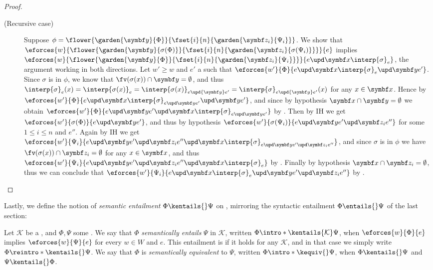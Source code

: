 \begin{scope}
\begin{proof}
\begin{description}
    \item[(Recursive case)]
    Suppose $\phi =
    \flower{\garden{\by}{\Phi}}{\fset{i}{n}{\garden{\bz_i}{\Psi_i}}}$. We show
    that
    $\eforces{w}{\flower{\garden{\by}{\sigma(\Phi)}}{\fset{i}{n}{\garden{\bz_i}{\sigma(\Psi_i)}}}}{e}$
    implies
    $\eforces{w}{\flower{\garden{\by}{\Phi}}{\fset{i}{n}{\garden{\bz_i}{\Psi_i}}}}{\update{e}{\bx}{\interp{\sigma}}_e}$,
    the argument working in both directions. Let $w' \geq w$ and $e'$ a
     such that
    $\eforces{w'}{\Phi}{\update{e}{\bx}{\update{\interp{\sigma}_e}{\by}{e'}}}$.
    Since $\sigma$ is  in $\phi$, we know that $\fv(\sigma(x))
    \cap \by = \emptyset$, and thus $\interp{\sigma}_e(x) =
    \interp{\sigma(x)}_{e} = \interp{\sigma(x)}_{e \upd{\by} e'} =
    \interp{\sigma}_{e \upd{\by} e'}(x)$ for any $x \in \bx$. Hence by
    $\eforces{w'}{\Phi}{\update{e}{\bx}{\update{\interp{\sigma}_{\update{e}{\by}{e'}}}{\by}{e'}}}$,
    and since by hypothesis $\bx \cap \by = \emptyset$ we obtain
    $\eforces{w'}{\Phi}{\update{e}{\by}{\update{e'}{\bx}{\interp{\sigma}_{\update{e}{\by}{e'}}}}}$
    by . Then by IH we get
    $\eforces{w'}{\sigma(\Phi)}{\update{e}{\by}{e'}}$, and thus by hypothesis
    $\eforces{w'}{\sigma(\Psi_i)}{\update{e}{\by}{\update{e'}{\bz_i}{e''}}}$ for
    some $1 \leq i \leq n$ and  $e''$. Again by IH we get
    $\eforces{w'}{\Psi_i}{\update{e}{\by}{\update{e'}{\bz_i}{\update{e''}{\bx}{\interp{\sigma}_{\update{e}{\by}{\update{e'}{\bz_i}{e''}}}}}}}$,
    and since $\sigma$ is  in $\phi$ we have $\fv(\sigma(x))
    \cap \bz_i = \emptyset$ for any $x \in \bx$, and thus
    $\eforces{w'}{\Psi_i}{\update{e}{\by}{\update{e'}{\bz_i}{\update{e''}{\bx}{\interp{\sigma}_{e}}}}}$
    by . Finally by hypothesis $\bx \cap \bz_i =
    \emptyset$, thus we can conclude that
    $\eforces{w'}{\Psi_i}{\update{e}{\bx}{\update{\interp{\sigma}_{e}}{\by}{\update{e'}{\bz_i}{e''}}}}$
    by .
  \end{description}
\end{proof}

Lastly, we define the notion of \emph{semantic entailment} $\Phi \kentails{} \Psi$ on
, mirroring the syntactic entailment $\Phi \entails{} \Psi$ of the last
section:

\begin{definition}
  Let $\mathcal{K}$ be a , and $\Phi, \Psi$ some
  . We say that $\Phi$ \emph{semantically entails} $\Psi$ in
  $\mathcal{K}$, written $\Phi \intro*\kentails{\mathcal{K}} \Psi$, when
  $\eforces{w}{\Phi}{e}$ implies $\eforces{w}{\Psi}{e}$ for every  $w
  \in W$ and  $e$. This entailment is  if it holds
  for any  $\mathcal{K}$, and in that case we simply write
  $\Phi \reintro*\kentails{} \Psi$. We say that $\Phi$ is \emph{semantically
  equivalent} to $\Psi$, written $\Phi \intro*\kequiv{} \Psi$, when $\Phi
  \kentails{}\Psi$ and $\Psi \kentails{}\Phi$.
\end{definition}


\end{scope}
